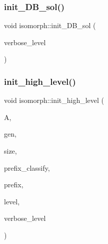 \mbox{\label{classisomorph_afd8d8a546fa9a7bc6f211b216e291039}} 
\subsubsection{\texorpdfstring{init\+\_\+\+D\+B\+\_\+sol()}{init\_DB\_sol()}}
{\footnotesize\ttfamily void isomorph\+::init\+\_\+\+D\+B\+\_\+sol (\begin{DoxyParamCaption}\item[{\mbox{\hyperlink{galois_8h_a09fddde158a3a20bd2dcadb609de11dc}{I\+NT}}}]{verbose\+\_\+level }\end{DoxyParamCaption})}

\mbox{\label{classisomorph_a5cee5468cc8cc68eac1f6131faedfab2}} 
\subsubsection{\texorpdfstring{init\+\_\+high\+\_\+level()}{init\_high\_level()}}
{\footnotesize\ttfamily void isomorph\+::init\+\_\+high\+\_\+level (\begin{DoxyParamCaption}\item[{\mbox{\hyperlink{classaction}{action}} $\ast$}]{A,  }\item[{\mbox{\hyperlink{classgenerator}{generator}} $\ast$}]{gen,  }\item[{\mbox{\hyperlink{galois_8h_a09fddde158a3a20bd2dcadb609de11dc}{I\+NT}}}]{size,  }\item[{\mbox{\hyperlink{galois_8h_ab6cc7b4aeb6ea31aba2b3fbfc83ff5e6}{B\+Y\+TE}} $\ast$}]{prefix\+\_\+classify,  }\item[{\mbox{\hyperlink{galois_8h_ab6cc7b4aeb6ea31aba2b3fbfc83ff5e6}{B\+Y\+TE}} $\ast$}]{prefix,  }\item[{\mbox{\hyperlink{galois_8h_a09fddde158a3a20bd2dcadb609de11dc}{I\+NT}}}]{level,  }\item[{\mbox{\hyperlink{galois_8h_a09fddde158a3a20bd2dcadb609de11dc}{I\+NT}}}]{verbose\+\_\+level }\end{DoxyParamCaption})}

\mbox{\label{classisomorph_ac3c171a595b93a33ac8a9e5d2d7b6eab}} 
